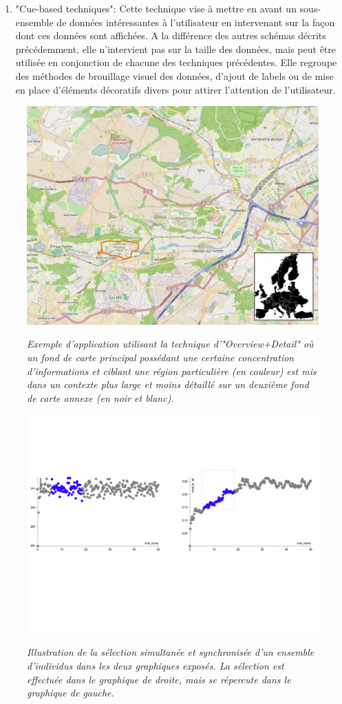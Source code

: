 \begin{enumerate}
    \item "Cue-based techniques": Cette technique vise à mettre en avant un sous-ensemble de données intéressantes à l'utilisateur en intervenant sur la façon dont ces données sont affichées. A la différence des autres schémas décrits précédemment, elle n'intervient pas sur la taille des données, mais peut être utilisée en conjonction de chacune des techniques précédentes. Elle regroupe des méthodes de brouillage visuel des données, d'ajout de labels ou de mise en place d'éléments décoratifs divers pour attirer l'attention de l'utilisateur.
\end{enumerate}

\begin{figure}
  \centering
  {\includegraphics[width=.65\linewidth]{./figures/ch2/ch2_overview+detail}}
    \caption{{\it Exemple d'application utilisant la technique d'"Overview+Detail" où un fond de carte principal possédant une certaine concentration d'informations et ciblant une région particulière (en couleur) est mis dans un contexte plus large et moins détaillé sur un deuxième fond de carte annexe (en noir et blanc).}}
  \label{Fig:overview+detail}
  \hspace{0.3cm}
\end{figure}

\begin{figure}
  \centering
  {\includegraphics[width=.75\linewidth]{./figures/ch2/ch2_focus+context}}
    \caption{{\it Illustration de la sélection simultanée et synchronisée d'un ensemble d'individus dans les deux graphiques exposés. La sélection est effectuée dans le graphique de droite, mais se répercute dans le graphique de gauche.}}
  \label{Fig:focus+context}
  \hspace{0.3cm}
\end{figure}


